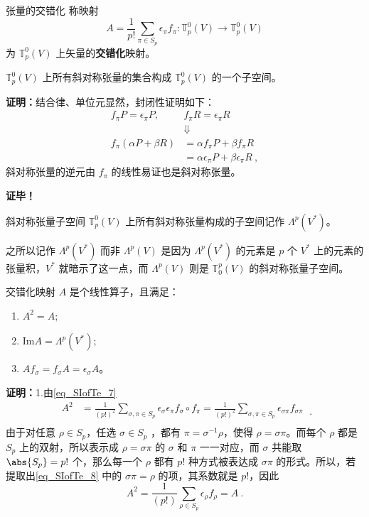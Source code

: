 \begin{definition}{张量的交错化}\label{def_SIofTe_1}
称映射
\begin{equation}\label{eq_SIofTe_7}
A=\frac{1}{p!}\sum_{\pi\in S_p}\epsilon_\pi f_\pi:\mathbb{T}_p^0(V)\rightarrow\mathbb{T}_p^0(V)
\end{equation}
为 $\mathbb{T}_p^0(V)$ 上矢量的\textbf{交错化}映射。
\end{definition}
\begin{theorem}{}
$\mathbb{T}_p^0(V)$ 上所有斜对称张量的集合构成 $\mathbb{T}_p^0(V)$ 的一个子空间。
\end{theorem}
\textbf{证明：}结合律、单位元显然，封闭性证明如下：
\begin{equation}
\begin{aligned}
f_\pi P=\epsilon_\pi P,\quad&f_\pi R=\epsilon_\pi R\\
&\Downarrow\\
f_\pi(\alpha P+\beta R)&=\alpha f_\pi P+\beta f_\pi R\\
&=\alpha \epsilon_\pi P+\beta \epsilon_\pi R~,
\end{aligned}
\end{equation}
斜对称张量的逆元由 $f_\pi$ 的线性易证也是斜对称张量。

\textbf{证毕！}
\begin{definition}{斜对称张量子空间}
$\mathbb{T}_p^0(V)$ 上所有斜对称张量构成的子空间记作 $\Lambda^p(V^*)$。
\end{definition}
之所以记作  $\Lambda^p(V^*)$ 而非  $\Lambda^p(V)$ 是因为  $\Lambda^p(V^*)$ 的元素是 $p$ 个 $V^*$ 上的元素的张量积，$V^*$ 就暗示了这一点，而 $\Lambda^p(V)$ 则是 $\mathbb{T}_0^p(V)$ 的斜对称张量子空间。

\begin{theorem}{}\label{the_SIofTe_1}
交错化映射 $A$ 是个线性算子，且满足：
\begin{enumerate}
\item $A^2=A$;
\item $\mathrm{Im} A=\Lambda^p(V^*)$;
\item $Af_\sigma=f_\sigma A=\epsilon_\sigma A$。
\end{enumerate}
\end{theorem}
\textbf{证明：}1.由\autoref{eq_SIofTe_7} 
\begin{equation}\label{eq_SIofTe_8}
\begin{aligned}
A^2&=\frac{1}{(p!)^2}\sum_{\sigma,\pi\in S_p}\epsilon_\sigma\epsilon_\pi f_\sigma\circ f_\pi=\frac{1}{(p!)^2}\sum_{\sigma,\pi\in S_p}\epsilon_{\sigma\pi} f_{\sigma\pi}\\
\end{aligned}~.
\end{equation}
由于对任意 $\rho\in S_p$，任选 $\sigma\in S_p$ ，都有 $\pi=\sigma^{-1}\rho$，使得 $\rho=\sigma\pi$。而每个 $\rho$ 都是 $S_p$ 上的双射，所以表示成 $\rho=\sigma\pi$ 的 $\sigma$ 和 $\pi$ 一一对应，而 $\sigma$ 共能取 $\abs{S_p}=p!$ 个，那么每一个 $\rho$ 都有 $p!$ 种方式被表达成 $\sigma \pi$ 的形式。所以，若提取出\autoref{eq_SIofTe_8} 中的 $\sigma\pi=\rho$ 的项，其系数就是 $p!$，因此
\begin{equation}
A^2=\frac{1}{(p!)}\sum_{\rho\in S_p}\epsilon_\rho f_\rho=A~.
\end{equation}

